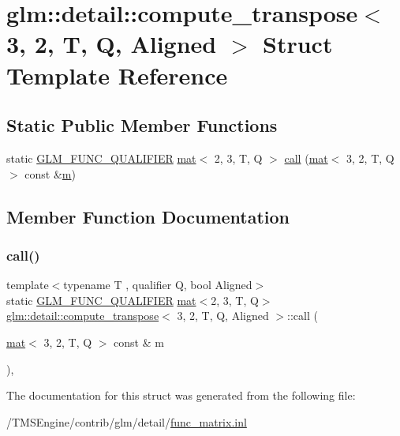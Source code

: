 \hypertarget{structglm_1_1detail_1_1compute__transpose_3_013_00_012_00_01_t_00_01_q_00_01_aligned_01_4}{}\section{glm\+:\+:detail\+:\+:compute\+\_\+transpose$<$ 3, 2, T, Q, Aligned $>$ Struct Template Reference}
\label{structglm_1_1detail_1_1compute__transpose_3_013_00_012_00_01_t_00_01_q_00_01_aligned_01_4}
\subsection*{Static Public Member Functions}
\begin{DoxyCompactItemize}
\item 
static \hyperlink{setup_8hpp_a33fdea6f91c5f834105f7415e2a64407}{G\+L\+M\+\_\+\+F\+U\+N\+C\+\_\+\+Q\+U\+A\+L\+I\+F\+I\+ER} \hyperlink{structglm_1_1mat}{mat}$<$ 2, 3, T, Q $>$ \hyperlink{structglm_1_1detail_1_1compute__transpose_3_013_00_012_00_01_t_00_01_q_00_01_aligned_01_4_adcfdfa46dfc616422904330e7a05cbf3}{call} (\hyperlink{structglm_1_1mat}{mat}$<$ 3, 2, T, Q $>$ const \&\hyperlink{_s_d_l__opengl__glext_8h_af593500c283bf1a787a6f947f503a5c2}{m})
\end{DoxyCompactItemize}


\subsection{Member Function Documentation}
\mbox{\label{structglm_1_1detail_1_1compute__transpose_3_013_00_012_00_01_t_00_01_q_00_01_aligned_01_4_adcfdfa46dfc616422904330e7a05cbf3}} 
\subsubsection{\texorpdfstring{call()}{call()}}
{\footnotesize\ttfamily template$<$typename T , qualifier Q, bool Aligned$>$ \\
static \hyperlink{setup_8hpp_a33fdea6f91c5f834105f7415e2a64407}{G\+L\+M\+\_\+\+F\+U\+N\+C\+\_\+\+Q\+U\+A\+L\+I\+F\+I\+ER} \hyperlink{structglm_1_1mat}{mat}$<$2, 3, T, Q$>$ \hyperlink{structglm_1_1detail_1_1compute__transpose}{glm\+::detail\+::compute\+\_\+transpose}$<$ 3, 2, T, Q, Aligned $>$\+::call (\begin{DoxyParamCaption}\item[{\hyperlink{structglm_1_1mat}{mat}$<$ 3, 2, T, Q $>$ const \&}]{m }\end{DoxyParamCaption})\hspace{0.3cm}{\ttfamily [inline]}, {\ttfamily [static]}}



The documentation for this struct was generated from the following file\+:\begin{DoxyCompactItemize}
\item 
/\+T\+M\+S\+Engine/contrib/glm/detail/\hyperlink{func__matrix_8inl}{func\+\_\+matrix.\+inl}\end{DoxyCompactItemize}

